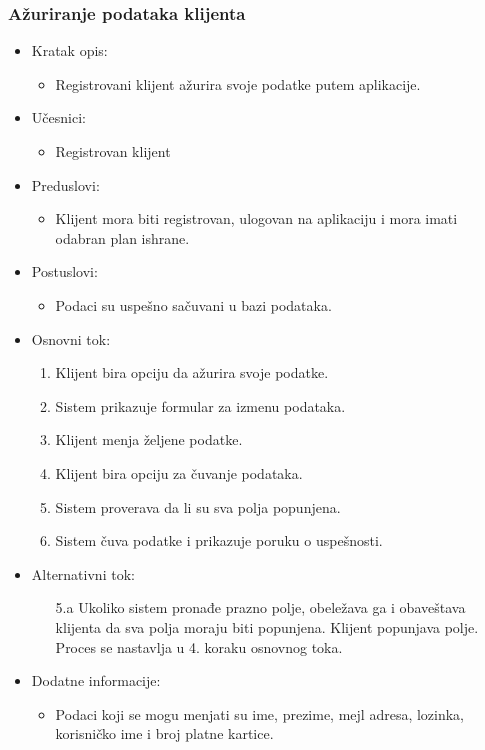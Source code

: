 \subsubsection{Ažuriranje podataka klijenta}

\begin{itemize}
    \item Kratak opis:
        \begin{itemize}
            \item Registrovani klijent ažurira svoje podatke putem aplikacije.
        \end{itemize}
    \item Učesnici:
        \begin{itemize}
            \item Registrovan klijent
        \end{itemize}
    \item Preduslovi:
        \begin{itemize}
            \item Klijent mora biti registrovan, ulogovan na aplikaciju i mora imati odabran plan ishrane.
        \end{itemize}
    \item Postuslovi:
        \begin{itemize}
            \item Podaci su uspešno sačuvani u bazi podataka.
        \end{itemize}
    \item Osnovni tok:
        \begin{enumerate}
            \item Klijent bira opciju da ažurira svoje podatke.
            \item Sistem prikazuje formular za izmenu podataka.
            \item Klijent menja željene podatke. 
            \item Klijent bira opciju za čuvanje podataka.
            \item Sistem proverava da li su sva polja popunjena.
            \item Sistem čuva podatke i prikazuje poruku o uspešnosti.
        \end{enumerate}
    \item Alternativni tok:
        \begin{itemize}
            \item[5.a] Ukoliko sistem pronađe prazno polje, obeležava ga i obaveštava klijenta da sva polja moraju biti popunjena. Klijent popunjava polje. Proces se nastavlja u 4. koraku osnovnog toka.
        \end{itemize}
    \item Dodatne informacije:
        \begin{itemize}
            \item Podaci koji se mogu menjati su ime, prezime, mejl adresa, lozinka, korisničko ime i broj platne kartice.
        \end{itemize}
\end{itemize}

